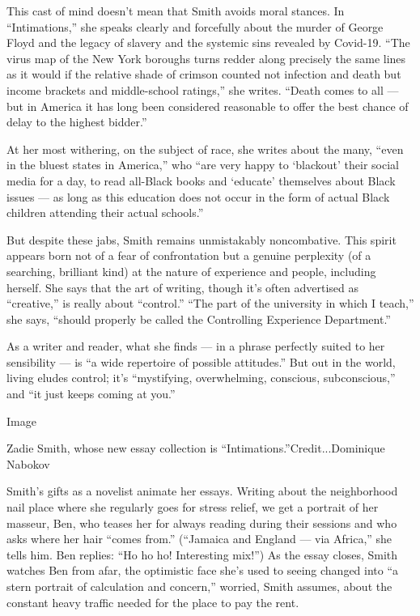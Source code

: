 This cast of mind doesn't mean that Smith avoids moral stances. In
``Intimations,'' she speaks clearly and forcefully about the murder of
George Floyd and the legacy of slavery and the systemic sins revealed by
Covid-19. ``The virus map of the New York boroughs turns redder along
precisely the same lines as it would if the relative shade of crimson
counted not infection and death but income brackets and middle-school
ratings,'' she writes. ``Death comes to all --- but in America it has
long been considered reasonable to offer the best chance of delay to the
highest bidder.''

At her most withering, on the subject of race, she writes about the
many, ``even in the bluest states in America,'' who ``are very happy to
`blackout' their social media for a day, to read all-Black books and
`educate' themselves about Black issues --- as long as this education
does not occur in the form of actual Black children attending their
actual schools.''

But despite these jabs, Smith remains unmistakably noncombative. This
spirit appears born not of a fear of confrontation but a genuine
perplexity (of a searching, brilliant kind) at the nature of experience
and people, including herself. She says that the art of writing, though
it's often advertised as ``creative,'' is really about ``control.''
``The part of the university in which I teach,'' she says, ``should
properly be called the Controlling Experience Department.''

As a writer and reader, what she finds --- in a phrase perfectly suited
to her sensibility --- is ``a wide repertoire of possible attitudes.''
But out in the world, living eludes control; it's ``mystifying,
overwhelming, conscious, subconscious,'' and ``it just keeps coming at
you.''

Image

Zadie Smith, whose new essay collection is
``Intimations.''Credit...Dominique Nabokov

Smith's gifts as a novelist animate her essays. Writing about the
neighborhood nail place where she regularly goes for stress relief, we
get a portrait of her masseur, Ben, who teases her for always reading
during their sessions and who asks where her hair ``comes from.''
(``Jamaica and England --- via Africa,'' she tells him. Ben replies:
``Ho ho ho! Interesting mix!'') As the essay closes, Smith watches Ben
from afar, the optimistic face she's used to seeing changed into ``a
stern portrait of calculation and concern,'' worried, Smith assumes,
about the constant heavy traffic needed for the place to pay the rent.

